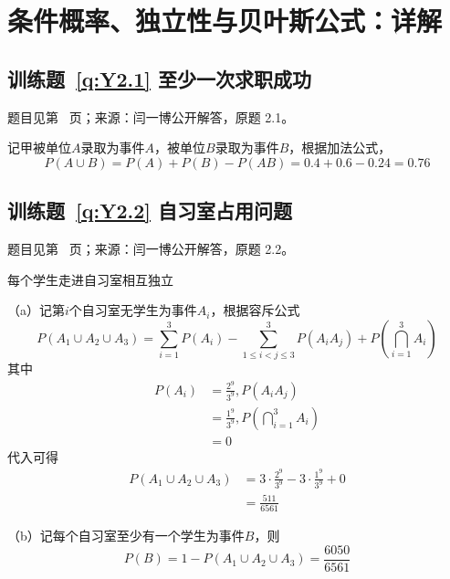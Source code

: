 \documentclass[UTF8,12pt,a4paper,fontset=fandol]{ctexbook}
\begin{document}
\clearpage\section*{条件概率、独立性与贝叶斯公式：详解}

\subsection*{训练题~\ref{q:Y2.1} 至少一次求职成功}\label{a:Y2.1}{\small 题目见第~\pageref{q:Y2.1} 页；来源：闫一博公开解答，原题 2.1。}
\begin{solve}
记甲被单位$A$录取为事件$A$，被单位$B$录取为事件$B$，根据加法公式，
\[P(A \cup B) = P(A) + P(B) - P(AB) = 0.4 + 0.6 - 0.24 = 0.76\]
\end{solve}

\subsection*{训练题~\ref{q:Y2.2} 自习室占用问题}\label{a:Y2.2}{\small 题目见第~\pageref{q:Y2.2} 页；来源：闫一博公开解答，原题 2.2。}
\begin{solve}
每个学生走进自习室相互独立

（a）记第$i$个自习室无学生为事件$A_i$，根据容斥公式
\[P({A_1} \cup {A_2} \cup {A_3}) = \sum\limits_{i = 1}^3 {P({A_i})}  - \sum\limits_{1 \leqslant i < j \leqslant 3}^3 {P({A_i}{A_j})}  + P(\bigcap\limits_{i = 1}^3 {{A_i}} )\]
其中
\[\begin{aligned}P({A_i}) &= \frac{{{2^9}}}{{{3^9}}},P({A_i}{A_j}) \\&= \frac{{{1^9}}}{{{3^9}}},P(\bigcap\limits_{i = 1}^3 {{A_i}} ) \\&= 0\end{aligned}\]
代入可得
\[\begin{aligned}P({A_1} \cup {A_2} \cup {A_3}) &= 3 \cdot \frac{{{2^9}}}{{{3^9}}} - 3 \cdot \frac{{{1^9}}}{{{3^9}}} + 0 \\&= \frac{{511}}{{6561}}\end{aligned}\]

（b）记每个自习室至少有一个学生为事件$B$，则
\[P(B) = 1 - P({A_1} \cup {A_2} \cup {A_3}) = \frac{{6050}}{{6561}}\]
\end{solve}
\end{document}
